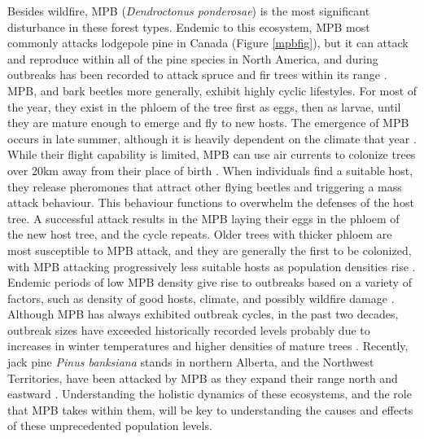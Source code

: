 Besides wildfire, MPB (\textit{Dendroctonus ponderosae}) is the most significant disturbance in these forest types. Endemic to this ecosystem, MPB most commonly attacks lodgepole pine in Canada \cite{safranyik2007mountain} (Figure \ref{mpbfig}), but it can attack and reproduce within all of the pine species in North America, and during outbreaks has been recorded to attack spruce and fir trees within its range \cite{gibson2009mountain}. MPB, and bark beetles more generally, exhibit highly cyclic lifestyles. For most of the year, they exist in the phloem of the tree first as eggs, then as larvae, until they are mature enough to emerge and fly to new hosts. The emergence of MPB occurs in late summer, although it is heavily dependent on the climate that year \cite{bentz2014mountain}. While their flight capability is limited, MPB can use air currents to colonize trees over 20km away from their place of birth \cite{shegelski2019morphological}. When individuals find a suitable host, they release pheromones that attract other flying beetles and triggering a mass attack behaviour. This behaviour functions to overwhelm the defenses of the host tree. A successful attack results in the MPB laying their eggs in the phloem of the new host tree, and the cycle repeats. Older trees with thicker phloem are most susceptible to MPB attack, and they are generally the first to be colonized, with MPB attacking progressively less suitable hosts as population densities rise \cite{safranyik2007mountain}. Endemic periods of low MPB density give rise to outbreaks based on a variety of factors, such as density of good hosts, climate, and possibly wildfire damage \cite{safranyik2007mountain}. Although MPB has always exhibited outbreak cycles, in the past two decades, outbreak sizes have exceeded historically recorded levels probably due to increases in winter temperatures and higher densities of mature trees \cite{bentz2010climate,safranyik2007mountain}. Recently, jack pine \textit{Pinus banksiana} stands in northern Alberta, and the Northwest Territories, have been attacked by MPB as they expand their range north and eastward \cite{cudmore2010climate,nrcanmpb}. Understanding the holistic dynamics of these ecosystems, and the role that MPB takes within them, will be key to understanding the causes and effects of these unprecedented population levels. 

